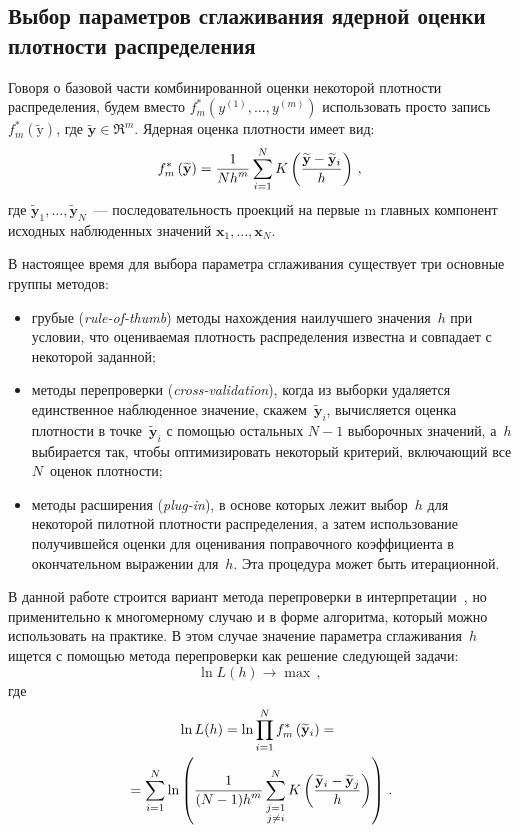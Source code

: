 \begin{multicols}{2}
\section{Выбор параметров сглаживания ядерной оценки плотности 
распределения}
      
      Говоря о базовой части комбинированной оценки некоторой плотности распределения, 
будем вместо $f^*_m\left(y^{(1)}, \ldots , y^{(m)}\right)$ использовать просто запись~$f^*_m\left ( 
\widetilde{\mathrm{y}}\right)$, где $\widetilde{\mathbf{y}}\in \Re^m$. Ядерная оценка плотности 
имеет вид: 
      $$
      f^*_m\left(\widetilde{\mathbf{y}}\right) =\displaystyle\frac{\displaystyle 1\mathstrut}{\displaystyle Nh^m\mathstrut}\sum\limits_{i=1}^N 
K\left(\displaystyle\frac{\displaystyle \widetilde{\mathbf{y}}-\widetilde{\mathbf{y}}_i\mathstrut}{\displaystyle h\mathstrut}\right)\,,
      $$
где $\widetilde{\mathbf{y}}_1, \ldots , \widetilde{\mathbf{y}}_N$~--- последовательность проекций 
на первые m главных компонент исходных наблюденных значений $\mathbf{x}_1, \ldots 
,\mathbf{x}_N$. 
      
      В настоящее время для выбора параметра сглаживания существует три основные группы 
методов:
      \begin{itemize}
\item грубые (\textit{rule-of-thumb}) методы нахождения наилучшего значения~$h$ при условии, 
что оцениваемая плотность распределения известна и совпадает с некоторой заданной;
\item методы перепроверки (\textit{cross-validation}), когда из выборки удаляется единственное 
наблюденное значение, скажем~$\widetilde{\mathbf{y}}_i$, вычисляется оценка плотности в 
точке~$\widetilde{\mathbf{y}}_i$ с помощью остальных $N-1$ выборочных значений, а~$h$ 
выбирается так, чтобы оптимизировать некоторый критерий, включающий все $N$~оценок 
плотности;
\item методы расширения (\textit{plug-in}), в основе которых лежит выбор~$h$ для некоторой 
пилотной плотности распределения, а затем использование получившейся оценки для оценивания 
поправочного коэффициента в окончательном выражении для~$h$. Эта процедура может быть 
итерационной.
\end{itemize}

      В данной работе строится вариант метода перепроверки в интерпретации~\cite{5kk}, но 
применительно к многомерному случаю и в форме алгоритма, который можно использовать на 
практике. В этом случае значение параметра сглаживания~$h$ ищется с помощью метода 
перепроверки как решение следующей задачи:
      \begin{equation}
      \ln L(h)\rightarrow \max\,,
      \label{e3.1kk}
      \end{equation}
где
\begin{multline*}
\ln L(h) =
\ln\prod\limits_{i=1}^N f^*_m\left ( \widetilde{\mathbf{y}}_i\right) ={}\\
{}
=\sum\limits_{i=1}^N\ln\left ( \displaystyle\frac{\displaystyle 1\mathstrut}{\displaystyle (N-1)h^m\mathstrut}\sum\limits_{\substack{{j=1}\\ {j\not=i}}}^N K  \left(
\displaystyle\frac{\displaystyle \widetilde{\mathbf{y}}_i-\widetilde{\mathbf{y}}_j\mathstrut}{\displaystyle h\mathstrut}\right)\right)\,.
\end{multline*}
      

\end{multicols}
